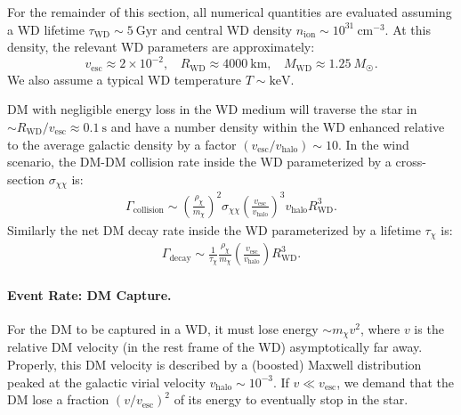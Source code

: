 \documentclass[preprintnumbers,amsmath,amssymb,prd,superscriptaddress]{revtex4}
\newcommand{\cm}{\text{cm}}
\def\r{\right)}
\def\l{\left(}
\begin{document}
For the remainder of this section, all numerical quantities are evaluated assuming a WD lifetime $\tau_\text{WD} \sim 5 ~\text{Gyr}$ and central WD density $n_\text{ion} \sim 10^{31} ~\cm^{-3}$. 
At this density, the relevant WD parameters are approximately: 
\begin{equation}
v_\text{esc} \approx 2 \times 10^{-2}, ~~~~ R_\text{WD} \approx 4000 ~\text{km}, ~~~~ M_\text{WD} \approx 1.25 ~M_{\astrosun}.
\end{equation}
We also assume a typical WD temperature $T \sim \text{keV}$.

DM with negligible energy loss in the WD medium will traverse the star in $\sim R_\text{WD}/v_\text{esc} \approx 0.1 ~\text{s}$ and have a number density within the WD enhanced relative to the average galactic density by a factor $(v_\text{esc}/v_\text{halo}) \sim 10$.
In the wind scenario, the DM-DM collision rate inside the WD parameterized by a cross-section $\sigma_{\chi \chi}$ is:
\begin{align}
  \Gamma_\text{collision}
  \sim \l \frac{\rho_\chi}{m_\chi} \r^2 \sigma_{\chi \chi} \l \frac{v_\text{esc}}{v_\text{halo}}\r^3 v_\text{halo} R_\text{WD}^3.
  \label{eq:collisionDM}
\end{align}
Similarly the net DM decay rate inside the WD parameterized by a lifetime $\tau_\chi$ is:
\begin{align}
 \Gamma_\text{decay}
   \sim \frac{1}{\tau_\chi} \frac{\rho_{\chi}}{m_\chi} \l \frac{v_\text{esc}}{v_\text{halo}}\r R_\text{WD}^3.
  \label{eq:decayDM}
\end{align}

\paragraph{Event Rate: DM Capture.}
For the DM to be captured in a WD, it must lose energy $\sim m_\chi v^2$, where $v$ is the relative DM velocity (in the rest frame of the WD) asymptotically far away.
Properly, this DM velocity is described by a (boosted) Maxwell distribution peaked at the galactic virial velocity $v_\text{halo} \sim 10^{-3}$. 
If $v \ll v_\text{esc}$, we demand that the DM lose a fraction $(v/v_\text{esc})^2$ of its energy to eventually stop in the star. 
\end{document}
